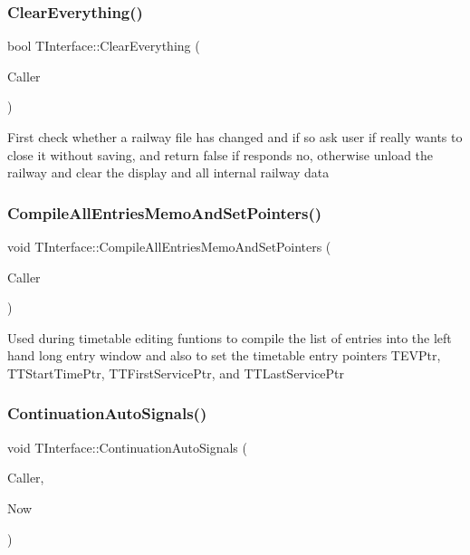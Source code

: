 \subsubsection{\texorpdfstring{Clear\+Everything()}{ClearEverything()}}
{\footnotesize\ttfamily bool T\+Interface\+::\+Clear\+Everything (\begin{DoxyParamCaption}\item[{int}]{Caller }\end{DoxyParamCaption})\hspace{0.3cm}{\ttfamily [private]}}

First check whether a railway file has changed and if so ask user if really wants to close it without saving, and return false if responds no, otherwise unload the railway and clear the display and all internal railway data \mbox{\label{class_t_interface_a330394a04433ce8672a52c2a0a659ff0}} 
\subsubsection{\texorpdfstring{Compile\+All\+Entries\+Memo\+And\+Set\+Pointers()}{CompileAllEntriesMemoAndSetPointers()}}
{\footnotesize\ttfamily void T\+Interface\+::\+Compile\+All\+Entries\+Memo\+And\+Set\+Pointers (\begin{DoxyParamCaption}\item[{int}]{Caller }\end{DoxyParamCaption})\hspace{0.3cm}{\ttfamily [private]}}

Used during timetable editing funtions to compile the list of entries into the left hand long entry window and also to set the timetable entry pointers T\+E\+V\+Ptr, T\+T\+Start\+Time\+Ptr, T\+T\+First\+Service\+Ptr, and T\+T\+Last\+Service\+Ptr \mbox{\label{class_t_interface_abfdbbb1cf793f965f8c6ce60d4bb46ae}} 
\subsubsection{\texorpdfstring{Continuation\+Auto\+Signals()}{ContinuationAutoSignals()}}
{\footnotesize\ttfamily void T\+Interface\+::\+Continuation\+Auto\+Signals (\begin{DoxyParamCaption}\item[{int}]{Caller,  }\item[{T\+Date\+Time}]{Now }\end{DoxyParamCaption})\hspace{0.3cm}{\ttfamily [private]}}

